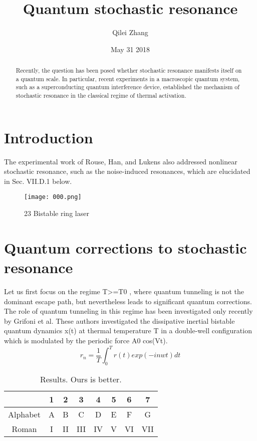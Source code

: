 \documentclass[30pt,twocolumn,letterpaper]{article}
\author{Qilei Zhang}
\date{May 31 2018}
\title{Quantum stochastic resonance}
\begin{document}
\maketitle
\begin{abstract}
   Recently, the question has been posed whether stochastic resonance manifests itself on a quantum scale. In particular, recent experiments in a macroscopic quantum system, such as a superconducting quantum interference device, established the mechanism of stochastic resonance in the classical regime of thermal activation.
\end{abstract}
\section{Introduction}
The experimental work of Rouse, Han, and Lukens also addressed nonlinear stochastic resonance, such as the noise-induced resonances, which are elucidated in Sec. VII.D.1 below\cite{Kim2006Stochastic}.
\begin{figure}[htbp]
\small
\centering
\texttt{[image: 000.png]}
\caption{23 Bistable ring laser}
\label{fig:lable}
\end{figure}
\section{Quantum corrections to stochastic resonance}
Let us first focus on the regime T>=T0 , where quantum tunneling is not the dominant escape path, but nevertheless leads to significant quantum corrections. The role of quantum tunneling in this regime has been investigated only recently by Grifoni et al. These authors investigated the dissipative inertial bistable quantum dynamics x(t) at thermal temperature T in a double-well configuration which is modulated by the periodic force A0 cos(Vt)\cite{Kurt2002Stochastic}. \\
\begin{equation}
r_n=\frac{1}{T}\int_0^T r(t)exp(-inwt)dt
\end{equation}
\begin{table}
\begin{center}
\begin{tabular}{cccccccc}
\toprule
         & 1 &  2  &   3  &  4  &  5  &  6  & 7 \\
\midrule
Alphabet & A &  B  &   C  &  D  &  E  &  F  & G\\
Roman    & I &  II &  III &  IV &  V  &  VI & VII\\
\bottomrule
\end{tabular}
\end{center}
\caption{Results.   Ours is better.}
\end{table}
\end{document}
